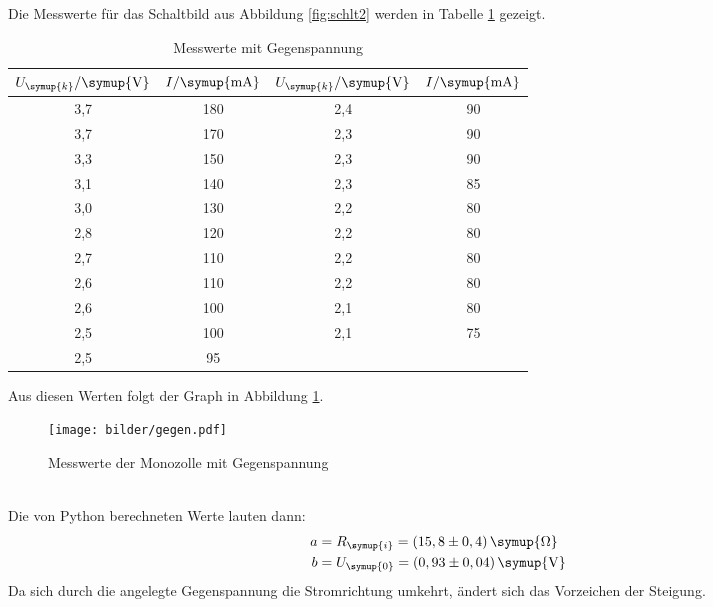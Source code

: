 \newpage
Die Messwerte für das Schaltbild aus Abbildung \ref{fig:schlt2} werden in
Tabelle \ref{tab:ggn} gezeigt.
\begin{table}[H]
  \centering
  \begin{tabular}{c c c c}
    \toprule
    $U_{\symup{k}}/\symup{\si{\volt}}$ & $I/\symup{\si{\milli\ampere}}$  &
    $U_{\symup{k}}/\symup{\si{\volt}}$ & $I/\symup{\si{\milli\ampere}}$  \\
    \midrule
    3,7  &  180  &  2,4  &  90  \\
    3,7  &  170  &  2,3  &  90  \\
    3,3  &  150  &  2,3  &  90  \\
    3,1  &  140  &  2,3  &  85  \\
    3,0  &  130  &  2,2  &  80  \\
    2,8  &  120  &  2,2  &  80  \\
    2,7  &  110  &  2,2  &  80  \\
    2,6  &  110  &  2,2  &  80  \\
    2,6  &  100  &  2,1  &  80  \\
    2,5  &  100  &  2,1  &  75  \\
    2,5  &   95  &  \hrulefill  &  \hrulefill \\
    \bottomrule
  \end{tabular}
  \caption{Messwerte mit Gegenspannung}
  \label{tab:ggn}
\end{table}
Aus diesen Werten folgt der Graph in Abbildung \ref{fig:ggn}.
\begin{figure}
  \centering
  \texttt{[image: bilder/gegen.pdf]}
  \caption{Messwerte der Monozolle mit Gegenspannung}
  \label{fig:ggn}
\end{figure}
\\
Die von Python berechneten Werte lauten dann:
\begin{align*}
   a &= R_\symup{i} = (15,8 \pm 0,4)\, \symup{\si{\ohm}} \\ %
   b &= U_\symup{0} = (0,93 \pm 0,04)\,\symup{\si{\volt}}
\end{align*}
Da sich durch die angelegte Gegenspannung die Stromrichtung umkehrt, ändert sich
das Vorzeichen der Steigung.



